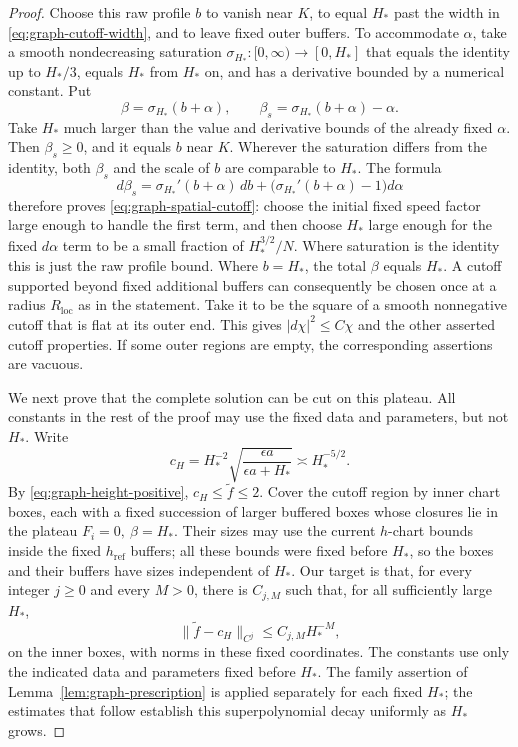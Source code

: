 \begin{proof}
Choose this raw profile \(b\) to vanish near \(K\), to equal
\(H_*\) past the width in \eqref{eq:graph-cutoff-width}, and to
leave fixed outer buffers.  To accommodate \(\alpha\), take a
smooth nondecreasing saturation
\(\sigma_{H_*}:[0,\infty)\to[0,H_*]\) that equals the identity
up to \(H_*/3\), equals \(H_*\) from \(H_*\) on, and has a
derivative bounded by a numerical constant.  Put
\[
 \beta=\sigma_{H_*}(b+\alpha),\qquad
 \beta_s=\sigma_{H_*}(b+\alpha)-\alpha .
\]
Take \(H_*\) much larger than the value and derivative bounds
of the already fixed \(\alpha\).  Then \(\beta_s\ge0\), and it
equals \(b\) near \(K\).  Wherever the saturation differs from
the identity, both \(\beta_s\) and the scale of \(b\) are
comparable to \(H_*\).  The formula
\[
 d\beta_s=\sigma_{H_*}'(b+\alpha)\,db
                  +\bigl(\sigma_{H_*}'(b+\alpha)-1\bigr)d\alpha
\]
therefore proves \eqref{eq:graph-spatial-cutoff}: choose the
initial fixed speed factor large enough to handle the first
term, and then choose \(H_*\) large enough for the fixed
\(d\alpha\) term to be a small fraction of
\(H_*^{3/2}/N\).  Where saturation is the identity this is just
the raw profile bound.  Where \(b=H_*\), the total \(\beta\)
equals \(H_*\).  A cutoff supported beyond fixed additional
buffers can consequently be chosen once at a radius
\(R_{\mathrm{loc}}\) as in the statement.  Take it to be the
square of a smooth nonnegative cutoff that is flat at its outer
end.  This gives \(|d\chi|^2\le C\chi\) and the other asserted
cutoff properties.  If some outer regions are empty, the
corresponding assertions are vacuous.

We next prove that the complete solution can be cut on this
plateau.  All constants in the rest of the proof may use the
fixed data and parameters, but not \(H_*\).  Write
\[
 c_H=H_*^{-2}\sqrt{\frac{\epsilon a}{\epsilon a+H_*}}
       \asymp H_*^{-5/2}.
\]
By \eqref{eq:graph-height-positive},
\(c_H\le\widetilde f\le2\).  Cover the cutoff region by inner chart
boxes, each with a fixed succession of larger buffered boxes whose
closures lie in the plateau \(F_i=0,\ \beta=H_*\).  Their sizes may
use the current \(h\)-chart bounds inside the fixed
\(h_{\mathrm{ref}}\) buffers; all these bounds were fixed before
\(H_*\), so the boxes and their buffers have sizes independent of
\(H_*\).  Our target is that, for every integer \(j\ge0\) and every
\(M>0\), there is \(C_{j,M}\) such that, for all sufficiently large
\(H_*\),
\begin{equation}
 \|\widetilde f-c_H\|_{C^j}
       \le C_{j,M}H_*^{-M},
 \label{eq:graph-plateau-jets}
\end{equation}
on the inner boxes, with norms in these fixed coordinates.
The constants use only the indicated data and parameters fixed
before \(H_*\).  The family assertion of
Lemma~\ref{lem:graph-prescription} is applied separately for each
fixed \(H_*\); the estimates that follow establish this
superpolynomial decay uniformly as \(H_*\) grows.


\end{proof}
